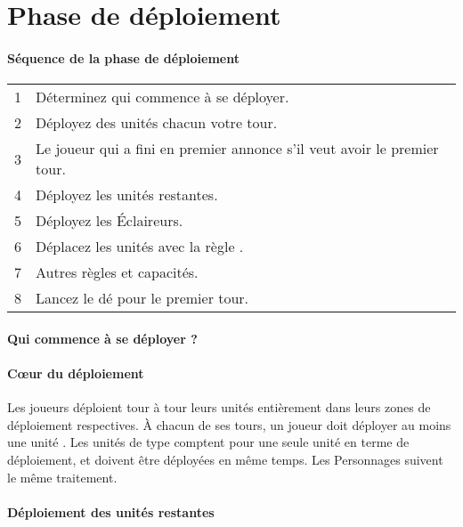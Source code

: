 
\part{Phase de déploiement}

\subsection{Séquence de la phase de déploiement}

\hspace*{0.3cm}
\begin{tabular}{c|l}
1 & Déterminez qui commence à se déployer. \tabularnewline
2 & Déployez des unités chacun votre tour. \tabularnewline
3 & Le joueur qui a fini en premier annonce s'il veut avoir le premier tour. \tabularnewline
4 & Déployez les unités restantes. \tabularnewline
5 & Déployez les Éclaireurs. \tabularnewline
6 & Déplacez les unités avec la règle \vanguard{}. \tabularnewline
7 & Autres règles et capacités. \tabularnewline
8 & Lancez le dé pour le premier tour. \tabularnewline
\end{tabular}

\subsection{Qui commence à se déployer ?}


\subsection{Cœur du déploiement}

Les joueurs déploient tour à tour leurs unités entièrement dans leurs zones de déploiement respectives. À chacun de ses tours, un joueur doit déployer au moins une unité . Les unités de type \warmachine{} comptent pour une seule unité en terme de déploiement, et doivent être déployées en même temps. Les Personnages suivent le même traitement. 

\subsection{Déploiement des unités restantes}

